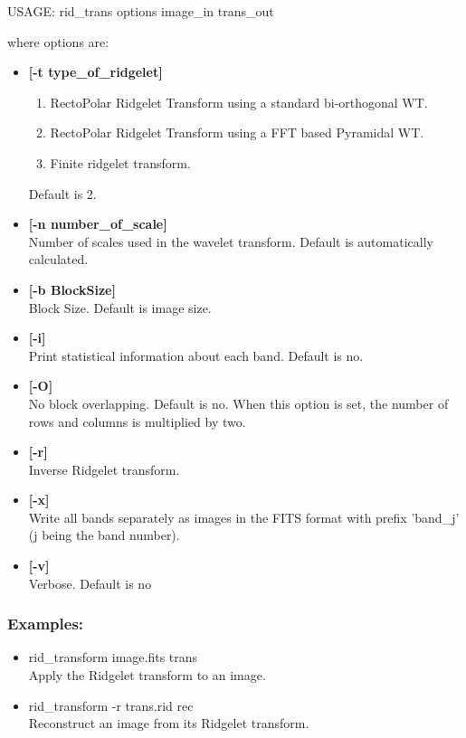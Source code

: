 {\bf
\begin{center}
 USAGE: rid\_trans options image\_in trans\_out
\end{center}}
where options are:

\begin{itemize}
\baselineskip=0.4truecm
\itemsep=0.1truecm
\item {\bf [-t type\_of\_ridgelet]}  
\begin{enumerate}
\baselineskip=0.4truecm
\itemsep=0.1truecm
\item RectoPolar Ridgelet Transform using a standard bi-orthogonal WT.
\item RectoPolar Ridgelet Transform using a FFT based Pyramidal WT.
\item Finite ridgelet transform.
\end{enumerate}
Default is 2.
\item {\bf [-n number\_of\_scale]} \\
 Number of scales used in the wavelet transform.
 Default is automatically calculated.
\item {\bf [-b BlockSize]} \\
Block Size. Default is image size.
\item {\bf [-i]} \\
Print statistical information about each band. Default is no. 
\item {\bf [-O]} \\
 No block overlapping. Default is no. When this option is set, the 
 number of rows and columns is multiplied by two. 
\item {\bf [-r]} \\
Inverse Ridgelet transform.
\item {\bf [-x]} \\
 Write all bands separately as images in the FITS format with prefix 'band\_j' 
(j being the band number).
\item {\bf [-v]} \\
Verbose. Default is no
\end{itemize}

\subsubsection*{Examples:}
\begin{itemize}
\item rid\_transform image.fits trans\\
Apply the Ridgelet transform to an image.
\item rid\_transform -r trans.rid rec\\
 Reconstruct an image from its Ridgelet transform.
\end{itemize}

